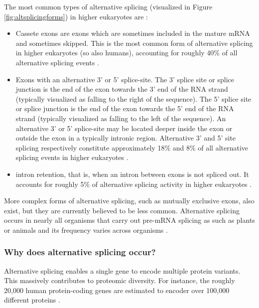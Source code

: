 The most common types of alternative splicing (visualized in Figure \ref{fig:altsplicingforms}) in higher eukaryotes are \cite{commonsplicing1}\cite{commonsplicing2}:
\begin{itemize}
	\item Cassete exons are exons which are sometimes included in the mature mRNA and sometimes skipped. This is the most common form of alternative splicing in higher eukaryotes (so also humans), accounting for roughly 40\% of all alternative splicing events \cite{splicing_current_perspectives}.
	\item Exons with an alternative 3' or 5' splice-site. The 3' splice site or splice junction is the end of the exon towards the 3' end of the RNA strand (typically visualized as falling to the right of the sequence). The 5' splice site or splice junction is the end of the exon towards the 5' end of the RNA strand (typically visualized as falling to the left of the sequence). An alternative 3' or 5' splice-site may be located deeper inside the exon or outside the exon in a typically intronic region. Alternative 3' and 5' site splicing respectively constitute approximately 18\% and 8\% of all alternative splicing events in higher eukaryotes \cite{splicing_current_perspectives}. 
	\item intron retention, that is, when an intron between exons is not spliced out. It accounts for roughly 5\% of alternative splicing activity in higher eukaryotes \cite{splicing_current_perspectives}.
\end{itemize}



More complex forms of alternative splicing, such as mutually exclusive exons, also exist, but they are currently believed to be less common. Alternative splicing occurs in nearly all organisms that carry out pre-mRNA splicing as such as plants or animals and its frequency varies across organisms \cite{splicing_current_perspectives}. 
\subsubsection{Why does alternative splicing occur?}
Alternative splicing enables a single gene to encode multiple protein variants. This massively contributes to proteomic diversity. For instance, the roughly 20,000 human protein-coding genes are estimated to encoder over 100,000 different proteins \cite{splicing_current_perspectives}.

